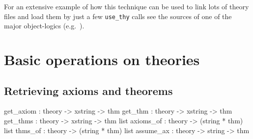 For an extensive example of how this technique can be used to link
lots of theory files and load them by just a few {\tt use_thy} calls
see the sources of one of the major object-logics (e.g.\ \ZF).



\section{Basic operations on theories}\label{BasicOperationsOnTheories}
\subsection{Retrieving axioms and theorems}
\begin{ttbox}
get_axiom : theory -> xstring -> thm
get_thm   : theory -> xstring -> thm
get_thms  : theory -> xstring -> thm list
axioms_of : theory -> (string * thm) list
thms_of   : theory -> (string * thm) list
assume_ax : theory -> string -> thm
\end{ttbox}
